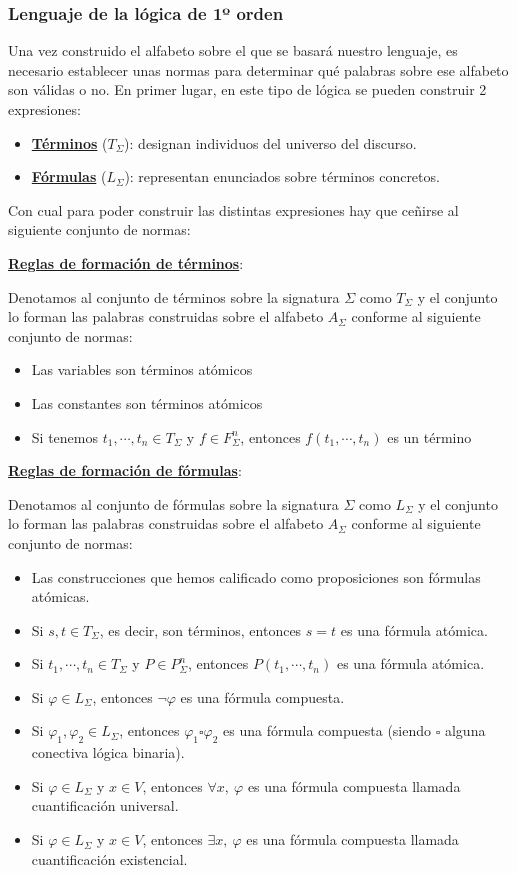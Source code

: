 \documentclass[10pt,a4paper,openright]{book}
\begin{document}
\subsubsection*{Lenguaje de la lógica de 1º orden}
Una vez construido el alfabeto sobre el que se basará nuestro lenguaje, es necesario establecer unas normas para determinar qué palabras sobre ese alfabeto son válidas o no. En primer lugar, en este tipo de lógica se pueden construir 2 expresiones:
\begin{itemize}
\item \underline{\textbf{Términos}} ($T_\Sigma$): designan individuos del universo del discurso.
\item \underline{\textbf{Fórmulas}} ($L_\Sigma$): representan enunciados sobre términos concretos.
\end{itemize}
Con cual para poder construir las distintas expresiones hay que ceñirse al siguiente conjunto de normas:

\underline{\textbf{Reglas de formación de términos}}:

Denotamos al conjunto de términos sobre la signatura $\Sigma$ como $T_\Sigma$ y el conjunto lo forman las palabras construidas sobre el alfabeto $A_\Sigma$ conforme al siguiente conjunto de normas:
\begin{itemize}
\item Las variables son términos atómicos
\item Las constantes son términos atómicos
\item Si tenemos $t_1, \cdots, t_n \in T_\Sigma$ y $f\in F^n_\Sigma$, entonces $f(t_1, \cdots, t_n)$ es un término
\end{itemize}

\underline{\textbf{Reglas de formación de fórmulas}}:

Denotamos al conjunto de fórmulas sobre la signatura $\Sigma$ como $L_\Sigma$ y el conjunto lo forman las palabras construidas sobre el alfabeto $A_\Sigma$ conforme al siguiente conjunto de normas:
\begin{itemize}
\item Las construcciones que hemos calificado como proposiciones son fórmulas atómicas.
\item Si $s,t\in T_\Sigma$, es decir, son términos, entonces $s=t$ es una fórmula atómica.
\item Si $t_1, \cdots, t_n\in T_\Sigma$ y $P\in P_\Sigma^n$, entonces $P(t_1,\cdots, t_n)$ es una fórmula atómica.
\item Si $\varphi \in L_\Sigma$, entonces $\neg \varphi$ es una fórmula compuesta.
\item Si $\varphi_1, \varphi_2\in L_\Sigma$, entonces $\varphi_1 \square \varphi_2$ es una fórmula compuesta (siendo $\square$ alguna conectiva lógica binaria).
\item Si $\varphi\in L_\Sigma$ y $x\in V$, entonces $\forall x, \ \varphi$ es una fórmula compuesta llamada cuantificación universal.
\item Si $\varphi\in L_\Sigma$ y $x\in V$, entonces $\exists x, \ \varphi$ es una fórmula compuesta llamada cuantificación existencial.
\end{itemize}
\end{document}
